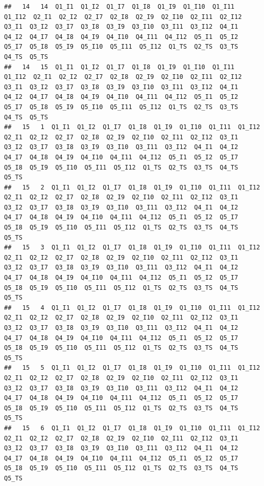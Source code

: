 \documentclass[
]{book}
\begin{document}
\begin{verbatim}
##   14   14  Q1_I1  Q1_I2  Q1_I7  Q1_I8  Q1_I9  Q1_I10  Q1_I11  Q1_I12  Q2_I1  Q2_I2  Q2_I7  Q2_I8  Q2_I9  Q2_I10  Q2_I11  Q2_I12  Q3_I1  Q3_I2  Q3_I7  Q3_I8  Q3_I9  Q3_I10  Q3_I11  Q3_I12  Q4_I1  Q4_I2  Q4_I7  Q4_I8  Q4_I9  Q4_I10  Q4_I11  Q4_I12  Q5_I1  Q5_I2  Q5_I7  Q5_I8  Q5_I9  Q5_I10  Q5_I11  Q5_I12  Q1_TS  Q2_TS  Q3_TS  Q4_TS  Q5_TS
##   14   15  Q1_I1  Q1_I2  Q1_I7  Q1_I8  Q1_I9  Q1_I10  Q1_I11  Q1_I12  Q2_I1  Q2_I2  Q2_I7  Q2_I8  Q2_I9  Q2_I10  Q2_I11  Q2_I12  Q3_I1  Q3_I2  Q3_I7  Q3_I8  Q3_I9  Q3_I10  Q3_I11  Q3_I12  Q4_I1  Q4_I2  Q4_I7  Q4_I8  Q4_I9  Q4_I10  Q4_I11  Q4_I12  Q5_I1  Q5_I2  Q5_I7  Q5_I8  Q5_I9  Q5_I10  Q5_I11  Q5_I12  Q1_TS  Q2_TS  Q3_TS  Q4_TS  Q5_TS
##   15   1  Q1_I1  Q1_I2  Q1_I7  Q1_I8  Q1_I9  Q1_I10  Q1_I11  Q1_I12  Q2_I1  Q2_I2  Q2_I7  Q2_I8  Q2_I9  Q2_I10  Q2_I11  Q2_I12  Q3_I1  Q3_I2  Q3_I7  Q3_I8  Q3_I9  Q3_I10  Q3_I11  Q3_I12  Q4_I1  Q4_I2  Q4_I7  Q4_I8  Q4_I9  Q4_I10  Q4_I11  Q4_I12  Q5_I1  Q5_I2  Q5_I7  Q5_I8  Q5_I9  Q5_I10  Q5_I11  Q5_I12  Q1_TS  Q2_TS  Q3_TS  Q4_TS  Q5_TS
##   15   2  Q1_I1  Q1_I2  Q1_I7  Q1_I8  Q1_I9  Q1_I10  Q1_I11  Q1_I12  Q2_I1  Q2_I2  Q2_I7  Q2_I8  Q2_I9  Q2_I10  Q2_I11  Q2_I12  Q3_I1  Q3_I2  Q3_I7  Q3_I8  Q3_I9  Q3_I10  Q3_I11  Q3_I12  Q4_I1  Q4_I2  Q4_I7  Q4_I8  Q4_I9  Q4_I10  Q4_I11  Q4_I12  Q5_I1  Q5_I2  Q5_I7  Q5_I8  Q5_I9  Q5_I10  Q5_I11  Q5_I12  Q1_TS  Q2_TS  Q3_TS  Q4_TS  Q5_TS
##   15   3  Q1_I1  Q1_I2  Q1_I7  Q1_I8  Q1_I9  Q1_I10  Q1_I11  Q1_I12  Q2_I1  Q2_I2  Q2_I7  Q2_I8  Q2_I9  Q2_I10  Q2_I11  Q2_I12  Q3_I1  Q3_I2  Q3_I7  Q3_I8  Q3_I9  Q3_I10  Q3_I11  Q3_I12  Q4_I1  Q4_I2  Q4_I7  Q4_I8  Q4_I9  Q4_I10  Q4_I11  Q4_I12  Q5_I1  Q5_I2  Q5_I7  Q5_I8  Q5_I9  Q5_I10  Q5_I11  Q5_I12  Q1_TS  Q2_TS  Q3_TS  Q4_TS  Q5_TS
##   15   4  Q1_I1  Q1_I2  Q1_I7  Q1_I8  Q1_I9  Q1_I10  Q1_I11  Q1_I12  Q2_I1  Q2_I2  Q2_I7  Q2_I8  Q2_I9  Q2_I10  Q2_I11  Q2_I12  Q3_I1  Q3_I2  Q3_I7  Q3_I8  Q3_I9  Q3_I10  Q3_I11  Q3_I12  Q4_I1  Q4_I2  Q4_I7  Q4_I8  Q4_I9  Q4_I10  Q4_I11  Q4_I12  Q5_I1  Q5_I2  Q5_I7  Q5_I8  Q5_I9  Q5_I10  Q5_I11  Q5_I12  Q1_TS  Q2_TS  Q3_TS  Q4_TS  Q5_TS
##   15   5  Q1_I1  Q1_I2  Q1_I7  Q1_I8  Q1_I9  Q1_I10  Q1_I11  Q1_I12  Q2_I1  Q2_I2  Q2_I7  Q2_I8  Q2_I9  Q2_I10  Q2_I11  Q2_I12  Q3_I1  Q3_I2  Q3_I7  Q3_I8  Q3_I9  Q3_I10  Q3_I11  Q3_I12  Q4_I1  Q4_I2  Q4_I7  Q4_I8  Q4_I9  Q4_I10  Q4_I11  Q4_I12  Q5_I1  Q5_I2  Q5_I7  Q5_I8  Q5_I9  Q5_I10  Q5_I11  Q5_I12  Q1_TS  Q2_TS  Q3_TS  Q4_TS  Q5_TS
##   15   6  Q1_I1  Q1_I2  Q1_I7  Q1_I8  Q1_I9  Q1_I10  Q1_I11  Q1_I12  Q2_I1  Q2_I2  Q2_I7  Q2_I8  Q2_I9  Q2_I10  Q2_I11  Q2_I12  Q3_I1  Q3_I2  Q3_I7  Q3_I8  Q3_I9  Q3_I10  Q3_I11  Q3_I12  Q4_I1  Q4_I2  Q4_I7  Q4_I8  Q4_I9  Q4_I10  Q4_I11  Q4_I12  Q5_I1  Q5_I2  Q5_I7  Q5_I8  Q5_I9  Q5_I10  Q5_I11  Q5_I12  Q1_TS  Q2_TS  Q3_TS  Q4_TS  Q5_TS

\end{verbatim}
\end{document}
